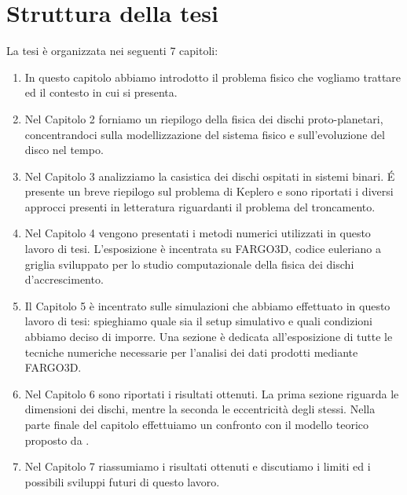 \section{Struttura della tesi}

La tesi è organizzata nei seguenti 7 capitoli:

\begin{enumerate}
  \item In questo capitolo abbiamo introdotto il problema fisico che vogliamo trattare ed il contesto in cui si presenta. 
  \item Nel Capitolo 2 forniamo un riepilogo della fisica dei dischi proto-planetari, concentrandoci sulla modellizzazione del sistema fisico e sull'evoluzione del disco nel tempo.
  \item Nel Capitolo 3 analizziamo la casistica dei dischi ospitati in sistemi binari. \'E presente un breve riepilogo sul problema di Keplero e sono riportati i diversi approcci presenti in letteratura riguardanti il problema del troncamento.
  \item Nel Capitolo 4 vengono presentati i metodi numerici utilizzati in questo lavoro di tesi. L'esposizione è incentrata su FARGO3D, codice euleriano a griglia sviluppato per lo studio computazionale della fisica dei dischi d'accrescimento.
  \item Il Capitolo 5 è incentrato sulle simulazioni che abbiamo effettuato in questo lavoro di tesi: spieghiamo quale sia il setup simulativo e quali condizioni abbiamo deciso di imporre. Una sezione è dedicata all'esposizione di tutte le tecniche numeriche necessarie per l'analisi dei dati prodotti mediante FARGO3D.
  \item Nel Capitolo 6 sono riportati i risultati ottenuti. La prima sezione riguarda le dimensioni dei dischi, mentre la seconda le eccentricità degli stessi. Nella parte finale del capitolo effettuiamo un confronto con il modello teorico proposto da \textcite{ManaraTronc2019}.
  \item Nel Capitolo 7 riassumiamo i risultati ottenuti e discutiamo i limiti ed i possibili sviluppi futuri di questo lavoro.  
\end{enumerate}
